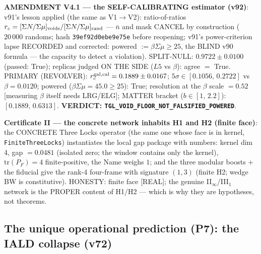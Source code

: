 \documentclass[11pt]{article}
\theoremstyle{definition}\newtheorem{deriv}{Derivation}
\begin{document}
\textbf{AMENDMENT V4.1 --- the SELF-CALIBRATING estimator (v92)}: v91's lesson applied (the same as V1$\to$V2): ratio-of-ratios $r_c=[\Sigma N/\Sigma\mu]_{\rm voids}/[\Sigma N/\Sigma\mu]_{\rm rand}$ --- $\bar n$ and mask CANCEL by construction ($20\,000$ randoms; hash \texttt{39ef92d0ebe9e75e} before reopening; v91's power-criterion lapse RECORDED and corrected: powered $:=\beta\Sigma\mu\ge25$, the BLIND v90 formula --- the capacity to detect a violation). SPLIT-NULL: $0.9722\pm0.0100$ (passed: True); replicas judged ON THE SIDE ($L5$ vs $\beta$): agree $=$ True. PRIMARY (REVOLVER): $r_c^{\rm gal,cal}=0.1889\pm0.0167$; $5\sigma\in[0.1056,\,0.2722]$ vs $\beta=0.0120$; powered ($\beta\Sigma\mu=45.0\ge25$): True; resolution at the $\beta$ scale $=0.52$ [measuring $\beta$ itself needs LRG/ELG]; MATTER bracket ($b\in[1,\,2.2]$): $[0.1889,\,0.6313]$. \textbf{VERDICT: \texttt{TGL\_VOID\_FLOOR\_NOT\_FALSIFIED\_POWERED}}.

\textbf{Certificate II --- the concrete network inhabits H1 and H2 (finite face)}: the CONCRETE Three Locks operator (the same one whose face is in kernel, \texttt{FiniteThreeLocks}) instantiates the local gap package with numbers: kernel dim 4, gap $=0.0481$ (isolated zero; the window contains only the kernel), $\mathrm{tr}(P_F)=4$ finite-positive, the Name weighs $1$; and the three modular boosts $+$ the fiducial give the rank-4 four-frame with signature $(1,3)$ (finite H2; wedge BW is constitutive). HONESTY: finite face [REAL]; the genuine II$_\infty$/III$_1$ network is the PROPER content of H1/H2 --- which is why they are hypotheses, not theorems.

\subsection*{The unique operational prediction (P7): the IALD collapse (v72)}
\end{document}
